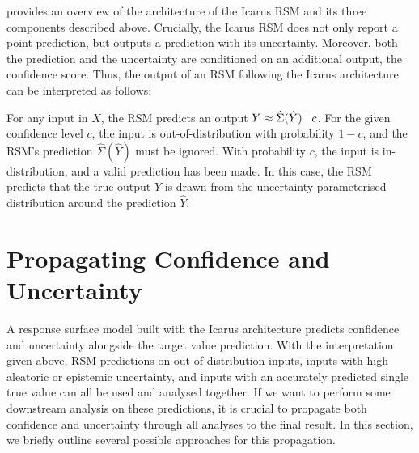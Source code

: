 \noindent {} provides an overview of the architecture of the Icarus RSM and its three components described above. Crucially, the Icarus RSM does not only report a point-prediction, but outputs a prediction with its uncertainty. Moreover, both the prediction and the uncertainty are conditioned on an additional output, the confidence score. Thus, the output of an RSM following the Icarus architecture can be interpreted as follows:

\newpar For any input in $X$, the RSM predicts an output $Y \approx \hat{\Sigma}(\hat{Y}) \mathrel{|} c$. For the given confidence level $c$, the input is out-of-distribution with probability $1-c$, and the RSM's prediction $\hat{\Sigma}(\hat{Y})$ must be ignored. With probability $c$, the input is in-distribution, and a valid prediction has been made. In this case, the RSM predicts that the true output $Y$ is drawn from the uncertainty-parameterised distribution around the prediction $\hat{Y}$.

\section{Propagating Confidence and Uncertainty} \label{txt:icarus-propagation}

A response surface model built with the Icarus architecture predicts confidence and uncertainty alongside the target value prediction. With the interpretation given above, RSM predictions on out-of-distribution inputs, inputs with high aleatoric or epistemic uncertainty, and inputs with an accurately predicted single true value can all be used and analysed together. If we want to perform some downstream analysis on these predictions, it is crucial to propagate both confidence and uncertainty through all analyses to the final result. In this section, we briefly outline several possible approaches for this propagation.

